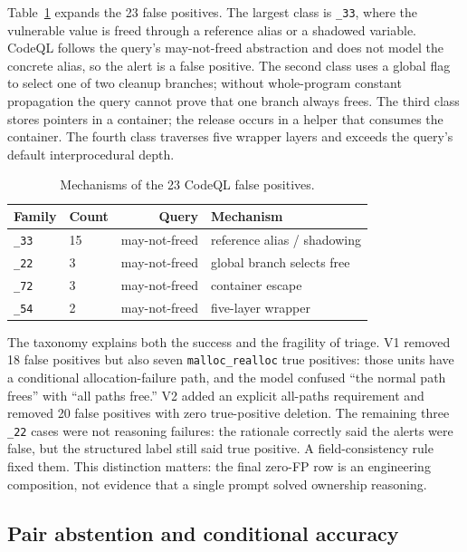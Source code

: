 \documentclass[conference]{IEEEtran}
\begin{document}
Table~\ref{tab:fptaxonomy} expands the 23 false positives. The largest class is \texttt{\_33}, where the vulnerable value is freed through a reference alias or a shadowed variable. CodeQL follows the query's may-not-freed abstraction and does not model the concrete alias, so the alert is a false positive. The second class uses a global flag to select one of two cleanup branches; without whole-program constant propagation the query cannot prove that one branch always frees. The third class stores pointers in a container; the release occurs in a helper that consumes the container. The fourth class traverses five wrapper layers and exceeds the query's default interprocedural depth.

\begin{table}[t]
\centering
\caption{Mechanisms of the 23 CodeQL false positives.}
\label{tab:fptaxonomy}
\footnotesize
\setlength{\tabcolsep}{3pt}
\begin{tabular}{@{}llrl@{}}
\toprule
Family & Count & Query & Mechanism \\
\midrule
\texttt{\_33} & 15 & may-not-freed & reference alias / shadowing \\
\texttt{\_22} & 3 & may-not-freed & global branch selects free \\
\texttt{\_72} & 3 & may-not-freed & container escape \\
\texttt{\_54} & 2 & may-not-freed & five-layer wrapper \\
\bottomrule
\end{tabular}
\end{table}

The taxonomy explains both the success and the fragility of triage. V1 removed 18 false positives but also seven \texttt{malloc\_realloc} true positives: those units have a conditional allocation-failure path, and the model confused ``the normal path frees'' with ``all paths free.'' V2 added an explicit all-paths requirement and removed 20 false positives with zero true-positive deletion. The remaining three \texttt{\_22} cases were not reasoning failures: the rationale correctly said the alerts were false, but the structured label still said true positive. A field-consistency rule fixed them. This distinction matters: the final zero-FP row is an engineering composition, not evidence that a single prompt solved ownership reasoning.

\subsection{Pair abstention and conditional accuracy}
\end{document}
